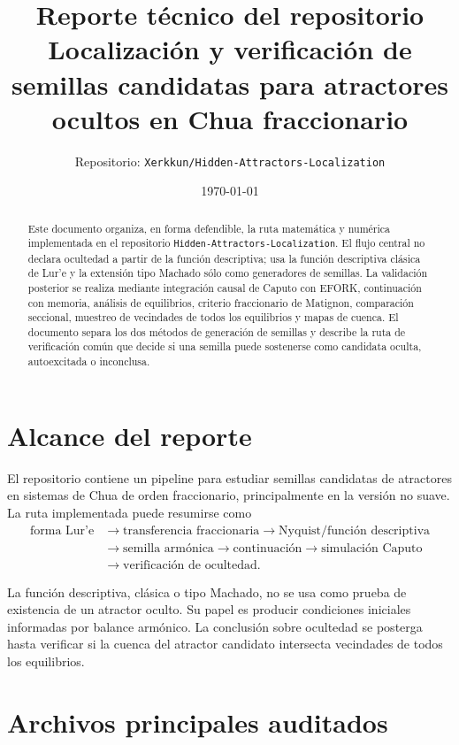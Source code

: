 \documentclass[11pt]{article}
\title{Reporte técnico del repositorio\\
\large Localización y verificación de semillas candidatas para atractores ocultos en Chua fraccionario}
\author{Repositorio: \texttt{Xerkkun/Hidden-Attractors-Localization}}
\date{\today}
\begin{document}
\maketitle

\begin{abstract}
Este documento organiza, en forma defendible, la ruta matemática y numérica implementada en el repositorio \texttt{Hidden-Attractors-Localization}. El flujo central no declara ocultedad a partir de la función descriptiva; usa la función descriptiva clásica de Lur'e y la extensión tipo Machado sólo como generadores de semillas. La validación posterior se realiza mediante integración causal de Caputo con EFORK, continuación con memoria, análisis de equilibrios, criterio fraccionario de Matignon, comparación seccional, muestreo de vecindades de todos los equilibrios y mapas de cuenca. El documento separa los dos métodos de generación de semillas y describe la ruta de verificación común que decide si una semilla puede sostenerse como candidata oculta, autoexcitada o inconclusa.
\end{abstract}

\tableofcontents

\section{Alcance del reporte}

El repositorio contiene un pipeline para estudiar semillas candidatas de atractores en sistemas de Chua de orden fraccionario, principalmente en la versión no suave. La ruta implementada puede resumirse como
\[
\begin{aligned}
\text{forma Lur'e}
&\longrightarrow \text{transferencia fraccionaria}
\longrightarrow \text{Nyquist/función descriptiva}\\
&\longrightarrow \text{semilla armónica}
\longrightarrow \text{continuación}
\longrightarrow \text{simulación Caputo}\\
&\longrightarrow \text{verificación de ocultedad}.
\end{aligned}
\]

La función descriptiva, clásica o tipo Machado, no se usa como prueba de existencia de un atractor oculto. Su papel es producir condiciones iniciales informadas por balance armónico. La conclusión sobre ocultedad se posterga hasta verificar si la cuenca del atractor candidato intersecta vecindades de todos los equilibrios.

\section{Archivos principales auditados}
\end{document}

